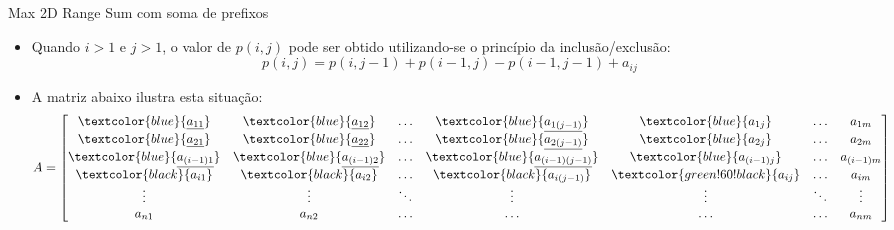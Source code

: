 \begin{frame}[fragile]{Max 2D Range Sum com soma de prefixos}

    \begin{itemize}
        \item Quando $i > 1$ e $j > 1$, o valor de $p(i, j)$ pode ser obtido utilizando-se o
            princípio da inclusão/exclusão:
        \[
            p(i, j) = p(i, j - 1) + p(i - 1, j) - p(i - 1, j - 1) + a_{ij}
        \]
        
        \item A matriz abaixo ilustra esta situação:
        \[
            A = \begin{bmatrix}
                    \textcolor{blue}{\underline{a_{11}}} & \textcolor{blue}{\underline{a_{12}}} &
                        \ldots & \textcolor{blue}{\underline{a_{1(j - 1)}}} & \textcolor{blue}{a_{1j}} & \ldots & a_{1m} \\
                    \textcolor{blue}{\underline{a_{21}}} & \textcolor{blue}{\underline{a_{22}}} &
                        \ldots & \textcolor{blue}{\underline{a_{2(j - 1)}}} & \textcolor{blue}{a_{2j}} & \ldots & a_{2m} \\
                    \textcolor{blue}{\underline{a_{(i - 1)1}}} & \textcolor{blue}{\underline{a_{(i - 1)2}}} &
                        \ldots & \textcolor{blue}{\underline{a_{(i - 1)(j - 1)}}} & \textcolor{blue}{a_{(i - 1)j}} & \ldots & a_{(i - 1)m} \\
                    \textcolor{black}{{a_{i1}}} & \textcolor{black}{{a_{i2}}} &
                        \ldots & \textcolor{black}{{a_{i(j - 1)}}} & \textcolor{green!60!black}{a_{ij}} & \ldots & a_{im} \\
                \vdots & \vdots & \ddots & \vdots & \vdots & \ddots & \vdots \\
                a_{n1} & a_{n2} & \ldots & \ldots & \ldots & \ldots & a_{nm} \\
                \end{bmatrix}
        \]
    \end{itemize}

\end{frame}

